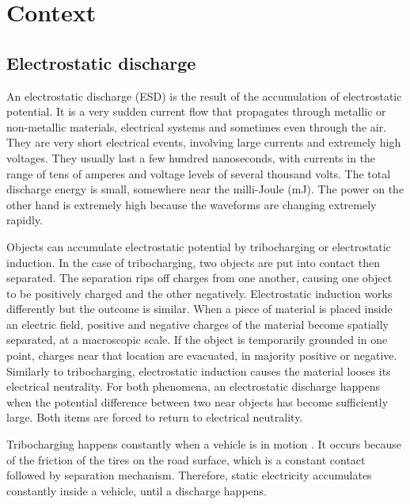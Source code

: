 \section{Context}
\subsection{Electrostatic discharge}

An electrostatic discharge (ESD) is the result of the accumulation of electrostatic potential.
It is a very sudden current flow that propagates through metallic or non-metallic materials, electrical systems and sometimes even through the air.
They are very short electrical events, involving large currents and extremely high voltages.
They usually last a few hundred nanoseconds, with currents in the range of tens of amperes and voltage levels of several thousand volts.
The total discharge energy is small, somewhere near the milli-Joule (mJ).
The power on the other hand is extremely high because the waveforms are changing extremely rapidly.

Objects can accumulate electrostatic potential by tribocharging or electrostatic induction.
In the case of tribocharging, two objects are put into contact then separated.
The separation rips off charges from one another, causing one object to be positively charged and the other negatively.
Electrostatic induction works differently but the outcome is similar.
When a piece of material is placed inside an electric field, positive and negative charges of the material become spatially separated, at a macroscopic scale.
If the object is temporarily grounded in one point, charges near that location are evacuated, in majority positive or negative.
Similarly to tribocharging, electrostatic induction causes the material looses its electrical neutrality.
For both phenomena, an electrostatic discharge happens when the potential difference between two near objects has become sufficiently large.
Both items are forced to return to electrical neutrality.

Tribocharging happens constantly when a vehicle is in motion \cite{generationESDautomotive}.
It occurs because of the friction of the tires on the road surface, which is a constant contact followed by separation mechanism.
Therefore, static electricity accumulates constantly inside a vehicle, until a discharge happens.

